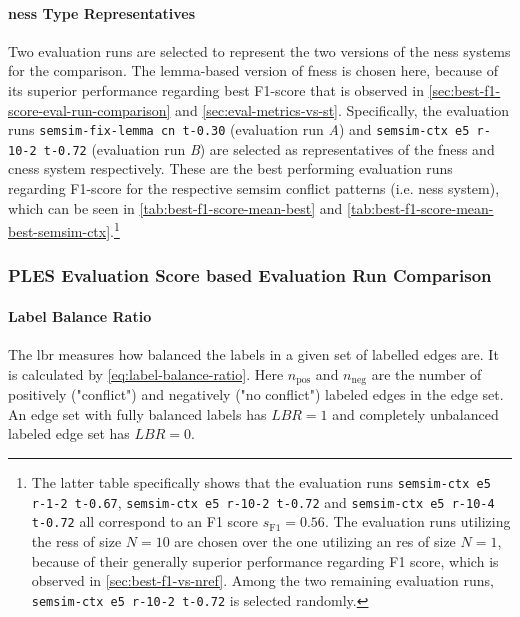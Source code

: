 \documentclass[11pt, numbers=noenddot]{scrreprt}
\begin{document}
\paragraph{\gls{ness} Type Representatives}
Two evaluation runs are selected to represent the two versions of the \gls{ness} systems for the comparison. The lemma-based version of \gls{fness} is chosen here, because of its superior performance regarding best F1-score that is observed in \cref{sec:best-f1-score-eval-run-comparison} and \cref{sec:eval-metrics-vs-st}. Specifically, the evaluation runs \texttt{semsim-fix-lemma cn t-0.30} (evaluation run \textit{A}) and \texttt{semsim-ctx e5 r-10-2 t-0.72} (evaluation run \textit{B}) are selected as representatives of the \gls{fness} and \gls{cness} system respectively. These are the best performing evaluation runs regarding F1-score for the respective semsim conflict patterns (i.e. \gls{ness} system), which can be seen in \cref{tab:best-f1-score-mean-best} and \cref{tab:best-f1-score-mean-best-semsim-ctx}.\footnote{
The latter table specifically shows that the evaluation runs \texttt{semsim-ctx e5 r-1-2 t-0.67}, \texttt{semsim-ctx e5 r-10-2 t-0.72} and \texttt{semsim-ctx e5 r-10-4 t-0.72} all correspond to an F1 score \(s_\text{F1} = 0.56\). The evaluation runs utilizing the \gls{res}s of size \(N = 10\) are chosen over the one utilizing an \gls{res} of size \(N = 1\), because of their generally superior performance regarding F1 score, which is observed in \cref{sec:best-f1-vs-nref}. Among the two remaining evaluation runs, \texttt{semsim-ctx e5 r-10-2 t-0.72} is selected randomly.



}

\subsubsection{PLES Evaluation Score based Evaluation Run Comparison}

\paragraph{Label Balance Ratio}
The \gls{lbr} measures how balanced the labels in a given set of labelled edges are. It is calculated by \cref{eq:label-balance-ratio}. Here \(n_\text{pos}\) and \(n_\text{neg}\) are the number of positively ("conflict") and negatively ("no conflict") labeled edges in the edge set.
An edge set with fully balanced labels has \(LBR = 1\) and completely unbalanced labeled edge set has \(LBR = 0\).
\end{document}
